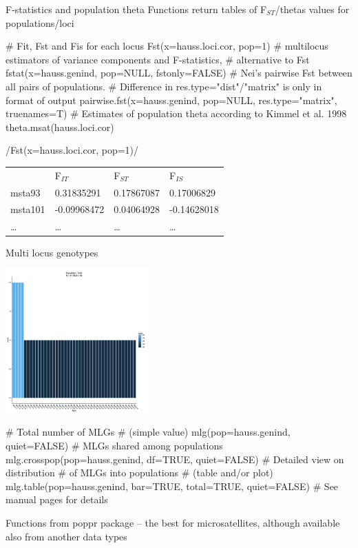 \documentclass[compress, ucs, xelatex, 11pt, xcolor=svgnames,
  hyperref={
    bookmarks=true,
    unicode=true,
    colorlinks=true,
    pdftitle={Molecular data in R},
    plainpages=false,
    pdfauthor={Vojtech Zeisek},
    pdfsubject={Course about phylogeny and evolution in R},
    pdfcreator={XeLaTeX},
    pdfkeywords={R, evolution, phylogeny, molecular data},
    linkcolor=Tomato,
    anchorcolor=SaddleBrown,
    citecolor=Goldenrod,
    filecolor=DarkMagenta,
    menucolor=Sienna,
    urlcolor=DarkTurquoise,
    pdftex},
  url={hyphens, lowtilde} %
  ]{beamer}
\begin{document}
\begin{frame}[fragile]{F-statistics and population theta}
Functions return tables of F$_{ST}$/thetas values for populations/loci
  \begin{spluscode}
    # Fit, Fst and Fis for each locus
    Fst(x=hauss.loci.cor, pop=1)
    # multilocus estimators of variance components and F-statistics,
    # alternative to Fst
    fstat(x=hauss.genind, pop=NULL, fstonly=FALSE)
    # Nei's pairwise Fst between all pairs of populations.
    # Difference in res.type="dist"/"matrix" is only in format of output
    pairwise.fst(x=hauss.genind, pop=NULL, res.type="matrix", truenames=T)
    # Estimates of population theta according to Kimmel et al. 1998
    theta.msat(hauss.loci.cor)
  \end{spluscode}
  \splus/Fst(x=hauss.loci.cor, pop=1)/
  \begin{tabular}{llll}
    & F$_{IT}$ & F$_{ST}$ & F$_{IS}$\\
    msta93 & 0.31835291 & 0.17867087 & 0.17006829\\
    msta101 & -0.09968472 & 0.04064928 & -0.14628018\\
    \ldots & \ldots & \ldots & \ldots
  \end{tabular}
\end{frame}

\begin{frame}[fragile]{Multi locus genotypes}
  \begin{multicols}{2}
  \includegraphics[height=5.5cm]{mlg.png}
  \begin{spluscode}
    # Total number of MLGs
    # (simple value)
    mlg(pop=hauss.genind, quiet=FALSE)
    # MLGs shared among populations
    mlg.crosspop(pop=hauss.genind,
      df=TRUE, quiet=FALSE)
    # Detailed view on distribution
    # of MLGs into populations
    # (table and/or plot)
    mlg.table(pop=hauss.genind,
      bar=TRUE, total=TRUE,
      quiet=FALSE)
    # See manual pages for details
  \end{spluscode}
  \end{multicols}
Functions from poppr package -- the best for microsatellites, although available also from another data types
\end{frame}
\end{document}
